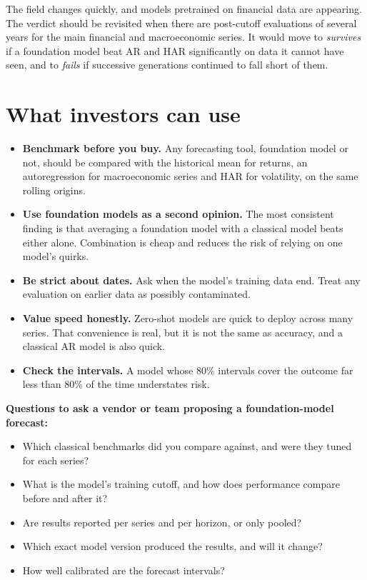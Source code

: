 The field changes quickly, and models pretrained on financial data are appearing. The verdict should be revisited when there are post-cutoff evaluations of several years for the main financial and macroeconomic series. It would move to \emph{survives} if a foundation model beat AR and HAR significantly on data it cannot have seen, and to \emph{fails} if successive generations continued to fall short of them.

\section{What investors can use}
\label{sec:21-investors}

\begin{itemize}
  \item \textbf{Benchmark before you buy.} Any forecasting tool, foundation model or not, should be compared with the historical mean for returns, an autoregression for macroeconomic series and HAR for volatility, on the same rolling origins.
  \item \textbf{Use foundation models as a second opinion.} The most consistent finding is that averaging a foundation model with a classical model beats either alone. Combination is cheap and reduces the risk of relying on one model's quirks.
  \item \textbf{Be strict about dates.} Ask when the model's training data end. Treat any evaluation on earlier data as possibly contaminated.
  \item \textbf{Value speed honestly.} Zero-shot models are quick to deploy across many series. That convenience is real, but it is not the same as accuracy, and a classical AR model is also quick.
  \item \textbf{Check the intervals.} A model whose 80\% intervals cover the outcome far less than 80\% of the time understates risk.
\end{itemize}

\textbf{Questions to ask a vendor or team proposing a foundation-model forecast:}

\begin{itemize}
  \item Which classical benchmarks did you compare against, and were they tuned for each series?
  \item What is the model's training cutoff, and how does performance compare before and after it?
  \item Are results reported per series and per horizon, or only pooled?
  \item Which exact model version produced the results, and will it change?
  \item How well calibrated are the forecast intervals?
\end{itemize}

